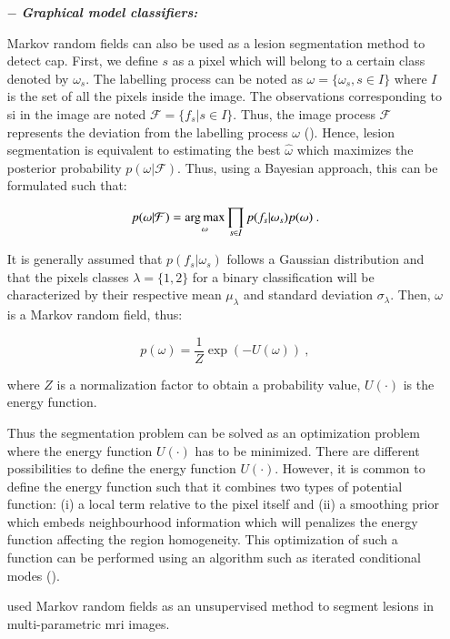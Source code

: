 \begin{enumerate}[leftmargin=*]
\item[$-$] \textbf{\textit{Graphical model classifiers:}}

Markov random fields can also be used as a lesion segmentation method to detect \ac{cap}. First, we define $s$ as a pixel which will belong to a certain class denoted by $\omega_s$. The labelling process can be noted as $\omega = \{\omega_s, s \in I\}$ where $I$ is the set of all the pixels inside the image. The observations corresponding to \ac{si} in the image are noted $\mathcal{F} = \{ f_s | s \in I \}$. Thus, the image process $\mathcal{F}$ represents the deviation from the labelling process $\omega$ (\cite{Kato2001}). Hence, lesion segmentation is equivalent to estimating the best $\hat{\omega}$ which maximizes the posterior probability $p(\omega|\mathcal{F})$. Thus, using a Bayesian approach, this can be formulated such that:

\begin{equation}
	p(\omega|\mathcal{F}) = \operatorname*{arg\,max}_{\omega} \prod_{s \in I} p(f_s | \omega_s) p(\omega) \ .
	\label{eq:mrf1}
\end{equation}

It is generally assumed that $p(f_s | \omega_s)$ follows a Gaussian distribution and that the pixels classes $\lambda = \{1,2\}$ for a binary classification will be characterized by their respective mean $\mu_{\lambda}$ and standard deviation $\sigma_{\lambda}$. Then, $\omega$ is a Markov random field, thus:

\begin{equation}
	p(\omega) =  \frac{1}{Z} \exp\left( -U(\omega) \right)  \ ,
	\label{eq:mrf2}
\end{equation}

\noindent where $Z$ is a normalization factor to obtain a probability value, $U(\cdot)$ is the energy function.

Thus the segmentation problem can be solved as an optimization problem where the energy function $U(\cdot)$ has to be minimized. There are different possibilities to define the energy function $U(\cdot)$. However, it is common to define the energy function such that it combines two types of potential function: (i) a local term relative to the pixel itself and (ii) a smoothing prior which embeds neighbourhood information which will penalizes the energy function affecting the region homogeneity. This optimization of such a function can be performed using an algorithm such as iterated conditional modes (\cite{Kato2001}).

\cite{Liu2009,Ozer2010} used Markov random fields as an unsupervised method to segment lesions in multi-parametric \ac{mri} images.


\end{enumerate}

